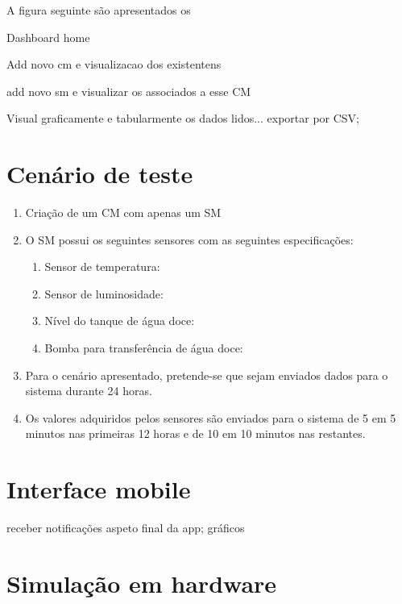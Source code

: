A figura seguinte são apresentados os 


Dashboard home

Add novo cm e visualizacao dos existentens

add novo sm e visualizar os associados a esse CM

Visual graficamente e tabularmente os dados lidos... exportar por CSV; 





\section{Cenário de teste}

\begin{enumerate}
	\item Criação de um \acl{CM} com apenas um \acl{SM}
	
	\item O \acl{SM} possui os seguintes sensores com as seguintes especificações: 
	
	\begin{enumerate}
		\item Sensor de temperatura: 
		\item Sensor de luminosidade: 
		\item Nível do tanque de água doce: 
		\item Bomba para transferência de água doce: 
	\end{enumerate}
	
	\item Para o cenário apresentado, pretende-se que sejam enviados dados para o sistema durante 24 horas. 
	
	\item Os valores adquiridos pelos sensores são enviados para o sistema de 5 em 5 minutos nas primeiras 12 horas e de 10 em 10 minutos nas restantes. 

	
\end{enumerate}


	
\section{Interface mobile}


receber notificações 
aspeto final da app; gráficos 


\section{Simulação em hardware}


